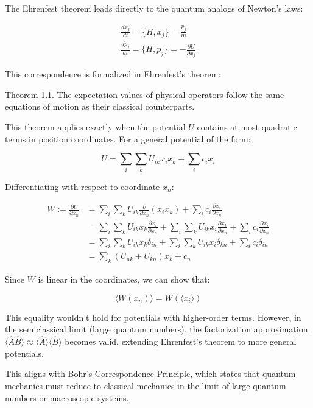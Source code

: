 The Ehrenfest theorem leads directly to the quantum analogs of Newton's laws:

\[
\begin{array}{r}
\frac{dx_j}{dt} = \{H, x_j\} = \frac{p_j}{m} \\
\frac{dp_j}{dt} = \{H, p_j\} = -\frac{\partial U}{\partial x_j}
\end{array}
\]

This correspondence is formalized in Ehrenfest's theorem:

Theorem 1.1. The expectation values of physical operators follow the same equations of motion as their classical counterparts.

This theorem applies exactly when the potential $U$ contains at most quadratic terms in position coordinates. For a general potential of the form:

\begin{equation}
U = \sum_i \sum_k U_{ik}x_i x_k + \sum_i c_i x_i
\end{equation}

Differentiating with respect to coordinate $x_n$:

\begin{align}
W := \frac{\partial U}{\partial x_n} &= \sum_i \sum_k U_{ik}\frac{\partial}{\partial x_n}(x_i x_k) + \sum_i c_i \frac{\partial x_i}{\partial x_n} \\
&= \sum_i \sum_k U_{ik}x_k\frac{\partial x_i}{\partial x_n} + \sum_i \sum_k U_{ik}x_i\frac{\partial x_k}{\partial x_n} + \sum_i c_i\frac{\partial x_i}{\partial x_n} \\
&= \sum_i \sum_k U_{ik}x_k\delta_{in} + \sum_i \sum_k U_{ik}x_i\delta_{kn} + \sum_i c_i\delta_{in} \\
&= \sum_k(U_{nk} + U_{kn})x_k + c_n
\end{align}

Since $W$ is linear in the coordinates, we can show that:

\begin{equation}
\langle W(x_n)\rangle = W(\langle x_i\rangle)
\end{equation}

This equality wouldn't hold for potentials with higher-order terms. However, in the semiclassical limit (large quantum numbers), the factorization approximation $\langle\hat{A}\hat{B}\rangle \approx \langle\hat{A}\rangle\langle\hat{B}\rangle$ becomes valid, extending Ehrenfest's theorem to more general potentials.

This aligns with Bohr's Correspondence Principle, which states that quantum mechanics must reduce to classical mechanics in the limit of large quantum numbers or macroscopic systems.
